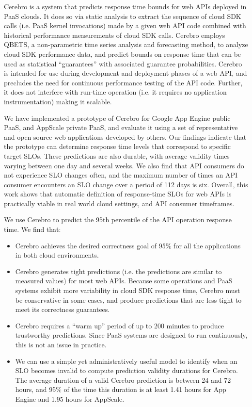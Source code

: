 Cerebro is a system that predicts response time 
bounds for web APIs deployed in PaaS clouds.  It does so via 
static analysis to extract the sequence of cloud SDK 
calls (i.e. PaaS kernel invocations) made by a given web API code combined with
historical performance measurements of cloud SDK calls. 
Cerebro employs QBETS, a non-parametric time series analysis and 
forecasting method, to analyze
cloud SDK performance data, and predict bounds
on response time that can be used as statistical ``guarantees'' with
associated guarantee probabilities.
Cerebro is intended for use during development and 
deployment phases of a web API, and 
precludes the need for continuous performance testing of the API code. 
Further, it does not interfere with run-time operation (i.e. it requires
no application instrumentation) making it scalable.

We have implemented a prototype of Cerebro for Google App Engine public PaaS,
and AppScale private PaaS,
and evaluate it using a set of representative
and open source web applications developed by others.  
Our findings indicate that the prototype can determine response time levels
that correspond to specific target SLOs.  These predictions are also durable,
with average validity times varying between one day and several weeks.
We also find that API consumers do not experience SLO changes often, and the maximum
number of times an API consumer encounters an SLO change over a period of 112 days is six.
Overall, this work shows that automatic definition of response-time SLOs for web APIs is practically
viable in real world cloud settings, and API consumer timeframes.

We use Cerebro to predict the 95th percentile of the API operation response time. 
We find that:
\begin{itemize}
\item Cerebro achieves the desired correctness goal of 95\% for all the applications in both cloud environments.
\item Cerebro generates tight predictions (i.e.
the predictions are similar to measured values) for most web APIs.  Because
some operations and PaaS systems exhibit more variability in cloud SDK response
time, 
Cerebro must be conservative in some cases, and produce predictions that are less tight
to meet its correctness guarantees.  
\item Cerebro requires a ``warm up'' period of up to 200 minutes to produce trustworthy 
predictions. Since PaaS systems are designed to run continuously, this is not an issue in practice. 
\item We can use a simple yet administratively useful model to identify when an 
SLO becomes invalid to compute
prediction validity durations for Cerebro.  The average duration of a valid
Cerebro prediction is between 24 and 72 hours,
and 95\% of the time this duration is at least 
1.41 hours for App Engine and 1.95 hours for AppScale.
\end{itemize}

